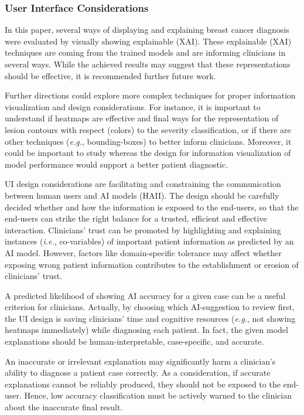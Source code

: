 \subsubsection{User Interface Considerations}

In this paper, several ways of displaying and explaining breast cancer diagnosis were evaluated by visually showing explainable (XAI).
These explainable (XAI) techniques are coming from the trained models and are informing clinicians in several ways.
While the achieved results may suggest that these representations should be effective, it is recommended further future work.

Further directions could explore more complex techniques for proper information visualization and design considerations.
For instance, it is important to understand if heatmaps are effective and final ways for the representation of lesion contours with respect (colors) to the severity classification, or if there are other techniques ({\it e.g.}, bounding-boxes) to better inform clinicians.
Moreover, it could be important to study whereas the design for information visualization of model performance would support a better patient diagnostic.

UI design considerations are facilitating and constraining the communication between human users and AI models (HAII).
The design should be carefully decided whether and how the information is exposed to the end-users, so that the end-users can strike the right balance for a trusted, efficient and effective interaction.
Clinicians' trust can be promoted by highlighting and explaining instances ({\it i.e.}, co-variables) of important patient information as predicted by an AI model.
However, factors like domain-specific tolerance may affect whether exposing wrong patient information contributes to the establishment or erosion of clinicians' trust.

A predicted likelihood of showing AI accuracy for a given case can be a useful criterion for clinicians.
Actually, by choosing which AI-suggestion to review first, the UI design is saving clinicians' time and cognitive resources ({\it e.g.}, not showing heatmaps immediately) while diagnosing each patient.
In fact, the given model explanations should be human-interpretable, case-specific, and accurate.

An inaccurate or irrelevant explanation may significantly harm a clinician's ability to diagnose a patient case correctly.
As a consideration, if accurate explanations cannot be reliably produced, they should not be exposed to the end-user.
Hence, low accuracy classification must be actively warned to the clinician about the inaccurate final result.

